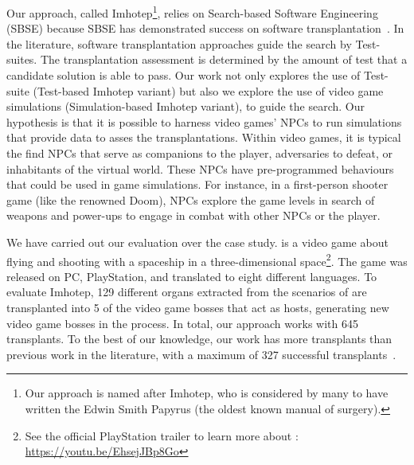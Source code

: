 
Our approach, called Imhotep\footnote{Our approach is named after Imhotep, who is considered by many to have written the Edwin Smith Papyrus (the oldest known manual of surgery).}, relies on Search-based Software Engineering (SBSE) because SBSE has demonstrated success on software transplantation~\cite{barr2015automated}. In the literature, software transplantation approaches guide the search by Test-suites. The transplantation assessment is determined by the amount of test that a candidate solution is able to pass. Our work not only explores the use of Test-suite (Test-based Imhotep variant) but also we explore the use of video game simulations (Simulation-based Imhotep variant), to guide the search.  Our hypothesis is that it is possible to harness video games' NPCs to run simulations that provide data to asses the transplantations. Within video games, it is typical the find NPCs that serve as companions to the player, adversaries to defeat, or inhabitants of the virtual world. These NPCs have pre-programmed behaviours that could be used in game simulations. For instance, in a first-person shooter game (like the renowned Doom), NPCs explore the game levels in search of weapons and power-ups to engage in combat with other NPCs or the player.

We have carried out our evaluation over the \CaseStudy{} case study. \CaseStudy{} is a video game about flying and shooting with a spaceship in a three-dimensional space\footnote{See the official PlayStation trailer to learn more about \CaseStudy{}: \url{https://youtu.be/EhsejJBp8Go}}. The game was released on PC, PlayStation, and translated to eight different languages.
To evaluate Imhotep, 129 different organs extracted from the scenarios of \CaseStudy{} are transplanted into 5 of the video game bosses that act as hosts, generating new video game bosses in the process. In total, our approach works with 645 transplants. To the best of our knowledge, our work has more transplants than previous work in the literature, with a maximum of 327 successful transplants~\cite{reid2020optimising}.

